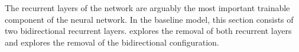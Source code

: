 
The recurrent layers of the network are arguably the most
important trainable component of the neural network. In the
baseline model, this section consists of two bidirectional
recurrent layers.  explores
the removal of both recurrent layers and
 explores the
removal of the bidirectional configuration. 
